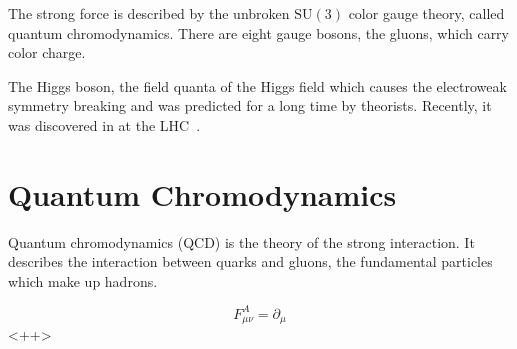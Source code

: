 The strong force is described by the unbroken $\mathrm{SU}(3)$ color gauge
theory, called quantum chromodynamics. There are eight gauge bosons, the gluons,
which carry color charge. 

The Higgs boson, the field quanta of the Higgs field which causes the
electroweak symmetry breaking and  was predicted for a long time by theorists.
Recently, it was discovered in at the LHC~\cite{Chatrchyan:2012xdj,Aad:2012tfa}.




\section{Quantum Chromodynamics}

Quantum chromodynamics (QCD) is the theory of the strong interaction. It
describes the interaction between quarks and gluons, the fundamental particles
which make up hadrons.

\begin{equation*}
    F_{\mu\nu}^A = \partial_\mu 
\end{equation*}<++>


